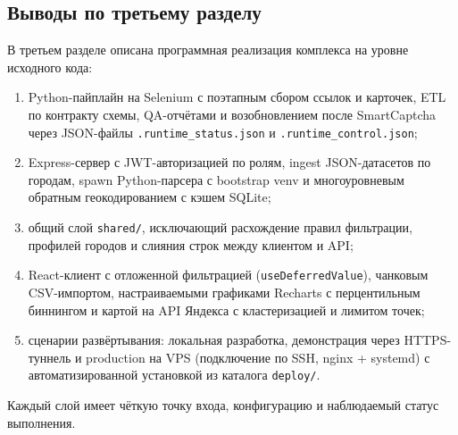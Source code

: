 \subsection{Выводы по третьему разделу}

В третьем разделе описана программная реализация комплекса на уровне исходного кода:
\begin{enumerate}
    \item Python-пайплайн на Selenium с поэтапным сбором ссылок и карточек, ETL по контракту схемы, QA-отчётами и возобновлением после SmartCaptcha через JSON-файлы \texttt{.runtime\_status.json} и \texttt{.runtime\_control.json};
    \item Express-сервер с JWT-авторизацией по ролям, ingest JSON-датасетов по городам, spawn Python-парсера с bootstrap venv и многоуровневым обратным геокодированием с кэшем SQLite;
    \item общий слой \texttt{shared/}, исключающий расхождение правил фильтрации, профилей городов и слияния строк между клиентом и API;
    \item React-клиент с отложенной фильтрацией (\texttt{useDeferredValue}), чанковым CSV-импортом, настраиваемыми графиками Recharts с перцентильным биннингом и картой на API Яндекса с кластеризацией и лимитом точек;
    \item сценарии развёртывания: локальная разработка, демонстрация через HTTPS-туннель и production на VPS (подключение по SSH, nginx + systemd) с автоматизированной установкой из каталога \texttt{deploy/}.
\end{enumerate}

Каждый слой имеет чёткую точку входа, конфигурацию и наблюдаемый статус выполнения.
